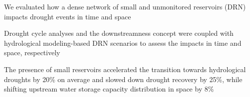 \documentclass[draft]{agujournal2019}
\begin{document}





\begin{keypoints}
\item We evaluated how a dense network of small and unmonitored reservoirs (DRN) impacts drought events in time and space
\item Drought cycle analyses and the downstreamness concept were coupled with hydrological modeling-based DRN scenarios to assess the impacts in time and space, respectively
\item The presence of small reservoirs accelerated the transition towards hydrological droughts by 20\% on average and slowed down drought recovery by 25\%, while shifting upstream water storage capacity distribution in space by 8\%
\end{keypoints}

%
%

%
%
\end{document}

